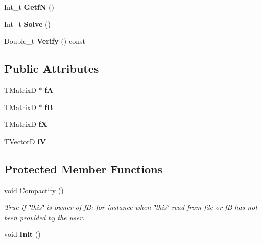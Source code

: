 \begin{DoxyCompactItemize}
\item 
\hypertarget{classTBandedLE_aee31a68599f547c764f4ecdafde6831f}{Int\-\_\-t {\bfseries Getf\-N} ()}\label{classTBandedLE_aee31a68599f547c764f4ecdafde6831f}

\item 
\hypertarget{classTBandedLE_acdc5e78e84c016c6b37c0f94e16184ca}{Int\-\_\-t {\bfseries Solve} ()}\label{classTBandedLE_acdc5e78e84c016c6b37c0f94e16184ca}

\item 
\hypertarget{classTBandedLE_adbcd39deac9f8711f7154e7552ca1151}{Double\-\_\-t {\bfseries Verify} () const }\label{classTBandedLE_adbcd39deac9f8711f7154e7552ca1151}

\end{DoxyCompactItemize}
\subsection*{Public Attributes}
\begin{DoxyCompactItemize}
\item 
\hypertarget{classTBandedLE_add083d782cac403e47ef44d1b047982f}{T\-Matrix\-D $\ast$ {\bfseries f\-A}}\label{classTBandedLE_add083d782cac403e47ef44d1b047982f}

\item 
\hypertarget{classTBandedLE_a6ff8099635a38a29aaab855688b61bb0}{T\-Matrix\-D $\ast$ {\bfseries f\-B}}\label{classTBandedLE_a6ff8099635a38a29aaab855688b61bb0}

\item 
\hypertarget{classTBandedLE_a7c68ccf2ccaea19424492c508febd82e}{T\-Matrix\-D {\bfseries f\-X}}\label{classTBandedLE_a7c68ccf2ccaea19424492c508febd82e}

\item 
\hypertarget{classTBandedLE_a044d8f4c2ac4dbd11798e6ace569058b}{T\-Vector\-D {\bfseries f\-V}}\label{classTBandedLE_a044d8f4c2ac4dbd11798e6ace569058b}

\end{DoxyCompactItemize}
\subsection*{Protected Member Functions}
\begin{DoxyCompactItemize}
\item 
\hypertarget{classTBandedLE_a8e09b2648396e1e8652ff8b0727965c1}{void \hyperlink{classTBandedLE_a8e09b2648396e1e8652ff8b0727965c1}{Compactify} ()}\label{classTBandedLE_a8e09b2648396e1e8652ff8b0727965c1}

\begin{DoxyCompactList}\small\item\em True if \char`\"{}this\char`\"{} is owner of f\-B\-: for instance when \char`\"{}this\char`\"{} read from file or f\-B has not been provided by the user. \end{DoxyCompactList}\item 
\hypertarget{classTBandedLE_a0171b48604c7767a1d2f798313874b87}{void {\bfseries Init} ()}\label{classTBandedLE_a0171b48604c7767a1d2f798313874b87}

\end{DoxyCompactItemize}
